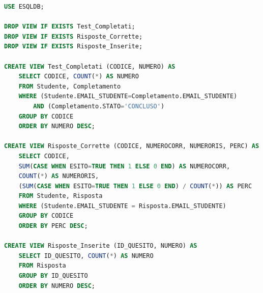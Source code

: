 \documentclass{article}
\begin{document}
\begin{lstlisting}[language=SQL, title=Codice SQL completo delle view dello schema della basi di dati.]
USE ESQLDB;

DROP VIEW IF EXISTS Test_Completati;
DROP VIEW IF EXISTS Risposte_Corrette;
DROP VIEW IF EXISTS Risposte_Inserite;

CREATE VIEW Test_Completati (CODICE, NUMERO) AS
    SELECT CODICE, COUNT(*) AS NUMERO
    FROM Studente, Completamento
    WHERE (Studente.EMAIL_STUDENTE=Completamento.EMAIL_STUDENTE) 
		AND (Completamento.STATO='CONCLUSO')
	GROUP BY CODICE
    ORDER BY NUMERO DESC;
   
CREATE VIEW Risposte_Corrette (CODICE, NUMEROCORR, NUMERORIS, PERC) AS
    SELECT CODICE, 
    SUM(CASE WHEN ESITO=TRUE THEN 1 ELSE 0 END) AS NUMEROCORR,
    COUNT(*) AS NUMERORIS,
    (SUM(CASE WHEN ESITO=TRUE THEN 1 ELSE 0 END) / COUNT(*)) AS PERC
    FROM Studente, Risposta
    WHERE (Studente.EMAIL_STUDENTE = Risposta.EMAIL_STUDENTE)
    GROUP BY CODICE
    ORDER BY PERC DESC;

CREATE VIEW Risposte_Inserite (ID_QUESITO, NUMERO) AS
    SELECT ID_QUESITO, COUNT(*) AS NUMERO
    FROM Risposta
    GROUP BY ID_QUESITO
    ORDER BY NUMERO DESC;
\end{lstlisting}
\end{document}
